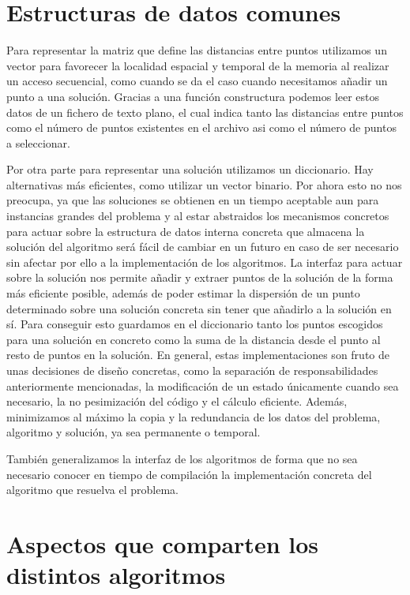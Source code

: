 \section{Estructuras de datos comunes}

Para representar la matriz que define las distancias entre puntos utilizamos un vector para favorecer la localidad espacial y
temporal de la memoria al realizar un acceso secuencial, como cuando se da el caso cuando necesitamos añadir un punto a una solución.
Gracias a una función constructura podemos leer estos datos de un fichero de texto plano, el cual indica tanto las distancias entre
puntos como el número de puntos existentes en el archivo asi como el número de puntos a seleccionar.

Por otra parte para representar una solución utilizamos un diccionario. Hay alternativas más eficientes, como utilizar un vector binario.
Por ahora esto no nos preocupa, ya que las soluciones se obtienen en un tiempo aceptable aun para instancias grandes del problema y 
al estar abstraidos los mecanismos concretos para actuar sobre la estructura de datos interna concreta que almacena la solución del
algoritmo será fácil de cambiar en un futuro en caso de ser necesario sin afectar por ello a la implementación de los algoritmos. La
interfaz para actuar sobre la solución nos permite añadir y extraer puntos de la solución de la forma más eficiente posible, además
de poder estimar la dispersión de un punto determinado sobre una solución concreta sin tener que añadirlo a la solución en sí. Para
conseguir esto guardamos en el diccionario tanto los puntos escogidos para una solución en concreto como la suma de la distancia desde
el punto al resto de puntos en la solución. En general, estas implementaciones son fruto de unas decisiones de diseño concretas, como la
separación de responsabilidades anteriormente mencionadas, la modificación de un estado únicamente cuando sea necesario, la no pesimización
del código y el cálculo eficiente. Además, minimizamos al máximo la copia y la redundancia de los datos del problema, algoritmo y solución,
ya sea permanente o temporal.

También generalizamos la interfaz de los algoritmos de forma que no sea necesario conocer en tiempo de compilación la implementación
concreta del algoritmo que resuelva el problema.

\section{Aspectos que comparten los distintos algoritmos}

